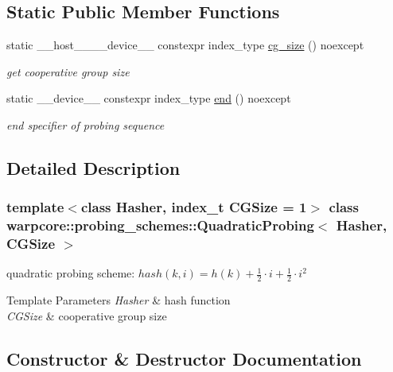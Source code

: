 \subsection*{Static Public Member Functions}
\begin{DoxyCompactItemize}
\item 
static \+\_\+\+\_\+host\+\_\+\+\_\+\+\_\+\+\_\+device\+\_\+\+\_\+ constexpr index\+\_\+type \hyperlink{classwarpcore_1_1probing__schemes_1_1QuadraticProbing_a20549e7a675cd8e4c422990267becbed}{cg\+\_\+size} () noexcept
\begin{DoxyCompactList}\small\item\em get cooperative group size \end{DoxyCompactList}\item 
static \+\_\+\+\_\+device\+\_\+\+\_\+ constexpr index\+\_\+type \hyperlink{classwarpcore_1_1probing__schemes_1_1QuadraticProbing_aa1eabb3eed4c1f2400fee8d7b487267e}{end} () noexcept
\begin{DoxyCompactList}\small\item\em end specifier of probing sequence \end{DoxyCompactList}\end{DoxyCompactItemize}


\subsection{Detailed Description}
\subsubsection*{template$<$class Hasher, index\+\_\+t C\+G\+Size = 1$>$\newline
class warpcore\+::probing\+\_\+schemes\+::\+Quadratic\+Probing$<$ Hasher, C\+G\+Size $>$}

quadratic probing scheme\+: $hash(k,i) = h(k)+\frac{1}{2}\cdot i+\frac{1}{2}\cdot i^2$ 


\begin{DoxyTemplParams}{Template Parameters}
{\em Hasher} & hash function \\
\hline
{\em C\+G\+Size} & cooperative group size \\
\hline
\end{DoxyTemplParams}


\subsection{Constructor \& Destructor Documentation}
\mbox{\label{classwarpcore_1_1probing__schemes_1_1QuadraticProbing_a90404a96e73f9914e7ea9b80b15895fa}} 
